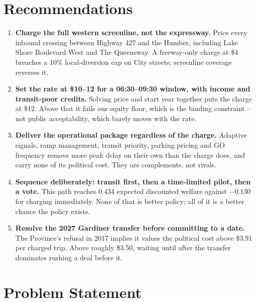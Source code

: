 \documentclass[11pt,letterpaper]{article}
\begin{document}
\section*{Recommendations}

\begin{enumerate}[leftmargin=*]

\item \textbf{Charge the full western screenline, not the expressway.} Price
every inbound crossing between Highway 427 and the Humber, including Lake Shore
Boulevard West and The Queensway. A freeway-only charge at \$4 breaches a 10\%
local-diversion cap on City streets; screenline coverage reverses it.

\item \textbf{Set the rate at \$10--12 for a 06:30--09:30 window, with income
and transit-poor credits.} Solving price and start year together puts the charge
at \$12. Above that it fails our equity floor, which is the binding constraint
-- not public acceptability, which barely moves with the rate.

\item \textbf{Deliver the operational package regardless of the charge.}
Adaptive signals, ramp management, transit priority, parking pricing and GO
frequency remove more peak delay on their own than the charge does, and carry
none of its political cost. They are complements, not rivals.

\item \textbf{Sequence deliberately: transit first, then a time-limited pilot,
then a vote.} This path reaches 0.434 expected discounted welfare against
$-$0.130 for charging immediately. None of that is better policy; all of it is a
better chance the policy exists.

\item \textbf{Resolve the 2027 Gardiner transfer before committing to a date.}
The Province's refusal in 2017 implies it values the political cost above \$3.91
per charged trip. Above roughly \$3.50, waiting until after the transfer
dominates rushing a deal before it.

\end{enumerate}

\section*{Problem Statement}
\end{document}
